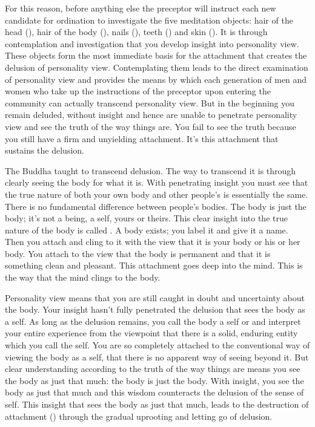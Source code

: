 For this reason, before anything else the preceptor will instruct each new candidate for  ordination to investigate the five meditation objects: hair of the head (), hair of the body (), nails (), teeth () and skin (). It is through contemplation and investigation that you develop insight into personality view. These objects form the most immediate basis for the attachment that creates the delusion of personality view. Contemplating them leads to the direct examination of personality view and provides the means by which each generation of men and women who take up the instructions of the preceptor upon entering the community can actually transcend personality view. But in the beginning you remain deluded, without insight and hence are unable to penetrate personality view and see the truth of the way things are. You fail to see the truth because you still have a firm and unyielding attachment. It's this attachment that sustains the delusion. 

The Buddha taught to transcend delusion. The way to transcend it is through clearly seeing the body for what it is. With penetrating insight you must see that the true nature of both your own body and other people's is essentially the same. There is no fundamental difference between people's bodies. The body is just the body; it's not a being, a self, yours or theirs. This clear insight into the true nature of the body is called . A body exists; you label it and give it a name. Then you attach and cling to it with the view that it is your body or his or her body. You attach to the view that the body is permanent and that it is something clean and pleasant. This attachment goes deep into the mind. This is the way that the mind clings to the body.

Personality view means that you are still caught in doubt and uncertainty about the body. Your insight hasn't fully penetrated the delusion that sees the body as a self. As long as the delusion remains, you call the body a self or  and interpret your entire experience from the viewpoint that there is a solid, enduring entity which you call the self. You are so completely attached to the conventional way of viewing the body as a self, that there is no apparent way of seeing beyond it. But clear understanding according to the truth of the way things are means you see the body as just that much: the body is just the body. With insight, you see the body as just that much and this wisdom counteracts the delusion of the sense of self. This insight that sees the body as just that much, leads to the destruction of attachment () through the gradual uprooting and letting go of delusion. 

